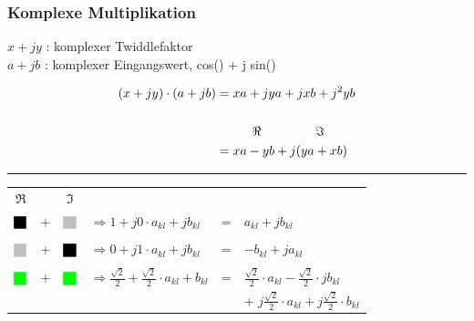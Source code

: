 \begin{frame}\frametitle{Komplexe Multiplikation}
\vspace{-0.6cm}
$x + jy$ : komplexer Twiddlefaktor \hspace{1cm}\\
$a + jb$ : komplexer Eingangswert, cos() + j sin()
\vspace{-0.5cm}
\begin{center}
\begin{equation*}
\begin{split}
(x+jy) \cdot (a+jb) &= xa + jya + jxb + j^2 yb\\
                    & \\
                    & \hspace{1cm} \Re \hspace{1.5cm} \Im \\
                    &= xa - yb + j(ya + xb)
\end{split}
\end{equation*}
\end{center}
\hrule
\pause
 \vspace{0.2cm}
\begin{tabular}{ccclll}
$\Re$	        & & $\Im$  & & \\
$\myboxOnePos $& +  & $\myboxZero$ 	& $\Rightarrow 1+j0 \cdot a_{kl} + jb_{kl}$ & = & $a_{kl} + jb_{kl}$\\
\\
\pause
$\myboxZero $& +  & $\myboxOnePos$ 	& $\Rightarrow 0+j1 \cdot a_{kl} + jb_{kl}$ & = & $-b_{kl} + ja_{kl}$\\
\\
\pause
$\myboxSqrtPos $& +  & $\myboxSqrtPos$ 	& $\Rightarrow \frac{\sqrt{2}}{2}+\frac{\sqrt{2}}{2} \cdot a_{kl} + b_{kl}$ & = & $\frac{\sqrt{2}}{2} \cdot a_{kl} - \frac{\sqrt{2}}{2} \cdot jb_{kl}$\\
& & & & &+ $j\frac{\sqrt{2}}{2} \cdot a_{kl} + j\frac{\sqrt{2}}{2} \cdot b_{kl}$\\
\end{tabular}
\end{frame}




